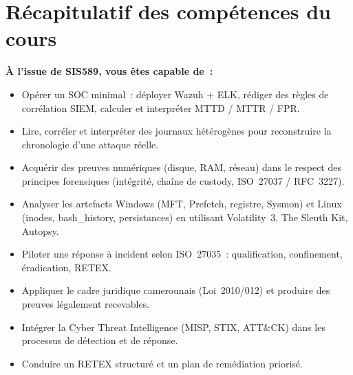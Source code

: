 \section*{Récapitulatif des compétences du cours}

\begin{boxresume}
\textbf{À l'issue de SIS589, vous êtes capable de~:}
\begin{itemize}
  \item Opérer un SOC minimal~: déployer Wazuh + ELK, rédiger des règles
        de corrélation SIEM, calculer et interpréter MTTD / MTTR / FPR.
  \item Lire, corréler et interpréter des journaux hétérogènes pour
        reconstruire la chronologie d'une attaque réelle.
  \item Acquérir des preuves numériques (disque, RAM, réseau) dans le
        respect des principes forensiques (intégrité, chaîne de custody,
        ISO~27037 / RFC~3227).
  \item Analyser les artefacts Windows (MFT, Prefetch, registre, Sysmon)
        et Linux (inodes, bash\_history, persistances) en utilisant
        Volatility~3, The Sleuth Kit, Autopsy.
  \item Piloter une réponse à incident selon ISO~27035~: qualification,
        confinement, éradication, RETEX.
  \item Appliquer le cadre juridique camerounais (Loi~2010/012) et
        produire des preuves légalement recevables.
  \item Intégrer la Cyber Threat Intelligence (MISP, STIX, ATT\&CK)
        dans les processus de détection et de réponse.
  \item Conduire un RETEX structuré et un plan de remédiation priorisé.
\end{itemize}
\end{boxresume}
